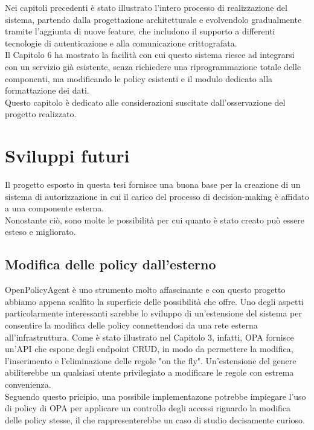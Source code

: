 Nei capitoli precedenti è stato illustrato l'intero processo di realizzazione del sistema, partendo dalla
progettazione architetturale e evolvendolo gradualmente tramite l'aggiunta di nuove feature, che includono il supporto a 
differenti tecnologie di autenticazione e alla comunicazione crittografata. 
\\ Il Capitolo 6 ha mostrato la facilità 
con cui questo sistema riesce ad integrarsi con un servizio già esistente, senza richiedere una 
riprogrammazione totale delle componenti, ma modificando le policy esistenti e il modulo dedicato alla formattazione dei dati. 
\\ Questo capitolo è dedicato alle considerazioni suscitate dall'osservazione del progetto realizzato. 

\section{Sviluppi futuri}
Il progetto esposto in questa tesi fornisce una buona base per la creazione di un sistema di autorizzazione 
in cui il carico del processo di decision-making è affidato a una componente esterna.  
\\ Nonostante ciò, sono molte le possibilità per cui quanto è stato creato può essere esteso e migliorato. 

\subsection{Modifica delle policy dall'esterno}
OpenPolicyAgent è uno strumento molto affascinante e con questo progetto abbiamo 
appena scalfito la superficie delle possibilità che offre. Uno degli aspetti particolarmente interessanti 
sarebbe lo sviluppo di un'estensione del sistema per consentire la modifica delle policy connettendosi da una 
rete esterna all'infrastruttura. Come è stato illustrato nel Capitolo 3, infatti, OPA fornisce un'API che espone degli 
endpoint CRUD, in modo da permettere la modifica, l'inserimento e l'eliminazione delle regole "on the fly".
Un'estensione del genere abiliterebbe un qualsiasi utente privilegiato a modificare le regole con estrema
 convenienza.   
\\ Seguendo questo pricipio, una possibile implementazone potrebbe impiegare l'uso di policy di OPA per applicare un controllo degli accessi 
riguardo la modifica delle policy stesse, il che rappresenterebbe un caso di studio decisamente curioso. 

